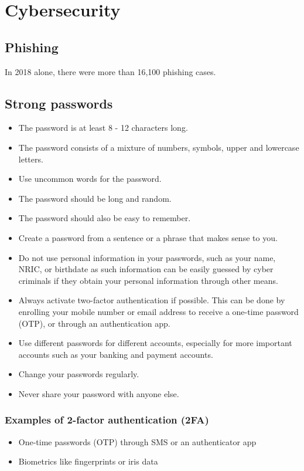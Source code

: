 \documentclass[11pt]{article}
\begin{document}
\section{Cybersecurity}
\label{sec:orga2aba66}

\subsection{Phishing}
\label{sec:org0ea2f31}
In 2018 alone, there were more than 16,100 phishing cases.

\subsection{Strong passwords}
\label{sec:org2a7add3}
\begin{itemize}
\item The password is at least 8 - 12 characters long.
\item The password consists of a mixture of numbers, symbols, upper and lowercase letters.
\item Use uncommon words for the password.
\item The password should be long and random.
\item The password should also be easy to remember.
\item Create a password from a sentence or a phrase that makes sense to you.
\item Do not use personal information in your passwords, such as your name, NRIC, or birthdate as such information can be easily guessed by cyber criminals if they obtain your personal information through other means.
\item Always activate two-factor authentication if possible. This can be done by enrolling your mobile number or email address to receive a one-time password (OTP), or through an authentication app.
\item Use different passwords for different accounts, especially for more important accounts such as your banking and payment accounts.
\item Change your passwords regularly.
\item Never share your password with anyone else.
\end{itemize}

\subsubsection{Examples of 2-factor authentication (2FA)}
\label{sec:org8ac7329}
\begin{itemize}
\item One-time passwords (OTP) through SMS or an authenticator app
\item Biometrics like fingerprints or iris data
\end{itemize}
\end{document}

